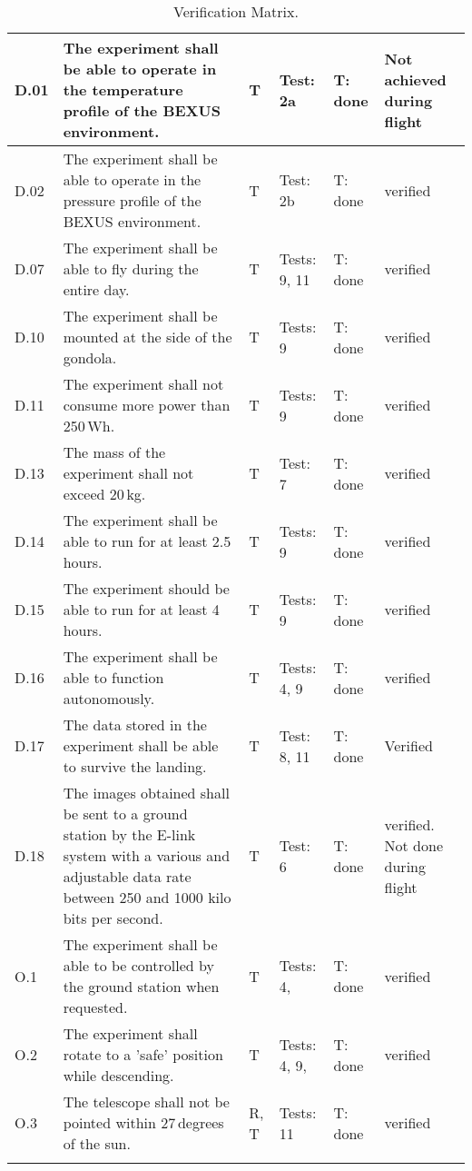 \begin{longtable}[]{|m{}| m{}|m{}|m{}|m{}|m{}|}
D.01 & The experiment shall be able to operate in the temperature profile of the BEXUS environment.
& T & Test: 2a & T: done & Not achieved during flight \\\hline

D.02 & The experiment shall be able to operate in the pressure profile of the BEXUS environment.
& T & Test: 2b  & T: done &  verified \\\hline

D.07 & The experiment shall be able to fly during the entire day.
& T & Tests: 9, 11 & T: done &  verified \\\hline

D.10 & The experiment shall be mounted at the side of the gondola.
& T & Tests: 9 & T: done & verified \\\hline

D.11 & The experiment shall not consume more power than 250\,Wh.
& T & Tests: 9 & T: done & verified \\\hline

D.13 & The mass of the experiment shall not exceed 20\,kg.
& T & Test: 7 & T: done &  verified \\\hline

D.14 & The experiment shall be able to run for at least 2.5\,hours.
& T & Tests: 9 & T: done &  verified \\\hline

D.15 & The experiment should be able to run for at least 4\,hours.
& T & Tests: 9 & T: done &  verified \\\hline

D.16 & The experiment shall be able to function autonomously.
& T & Tests: 4, 9 & T: done & verified \\\hline

D.17 & The data stored in the experiment shall be able to survive the landing.
& T & Test: 8, 11 & T: done & Verified \\\hline

  D.18 & The images obtained shall be sent to a ground station by the E-link system with a various and adjustable data rate between 250 and 1000 kilo bits per second.
& T & Test: 6 & T: done & verified. Not done during flight \\\hline




O.1 & The experiment shall be able to be controlled by the ground station when requested.
& T & Tests: 4, & T: done & verified \\\hline

O.2 & The experiment shall rotate to a 'safe' position while descending.
& T & Tests: 4, 9,  & T: done & verified \\\hline

 O.3 & The telescope shall not be pointed within 27\,degrees of the sun.
& R, T & Tests: 11 & T: done & verified \\\hline

\caption{Verification Matrix.}
\label{tab:var-mat}
\end{longtable}
\raggedbottom
